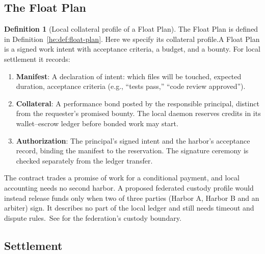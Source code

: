 \documentclass[11pt,a4paper]{article}
\theoremstyle{definition}
\newtheorem{definition}{Definition}[section]
\theoremstyle{remark}
\begin{document}
\subsection{The Float Plan}

\begin{definition}[Local collateral profile of a Float Plan]\label{def:bonded-float-plan}
\setlength{\parskip}{4pt plus 1pt}
\ifpdbook The Float Plan is defined in Definition~\ref{he:def:float-plan}. Here we specify its collateral profile.\else A Float Plan is a signed work intent with acceptance criteria, a budget, and a bounty.\fi
For local settlement it records:
\begin{enumerate}[nosep]
  \item \textbf{Manifest}: A declaration of intent: which files will be touched, expected duration, acceptance criteria (e.g., ``tests pass,'' ``code review approved'').
  \item \textbf{Collateral}: A performance bond posted by the responsible principal, distinct from the requester's promised bounty. The local daemon reserves credits in its wallet--escrow ledger before bonded work may start.
  \item \textbf{Authorization}: The principal's signed intent and the harbor's acceptance record, binding the manifest to the reservation. The signature ceremony is checked separately from the ledger transfer.
\end{enumerate}
\end{definition}

The contract trades a promise of work for a conditional payment, and local accounting needs no second harbor. A proposed federated custody profile would instead release funds only when two of three parties (Harbor A, Harbor B and an arbiter) sign. It describes no part of the local ledger and still needs timeout and dispute rules.\ifpdbook\ See  for the federation's custody boundary.\fi

\subsection{Settlement}
\end{document}
